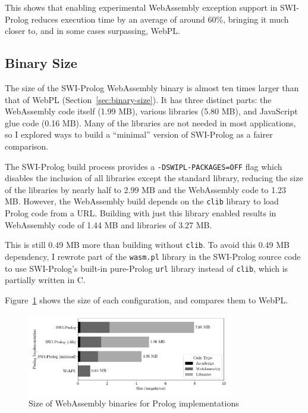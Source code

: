 This shows that enabling experimental WebAssembly exception support in SWI-Prolog reduces execution time by an average of around 60\%, bringing it much closer to, and in some cases surpassing, WebPL.

\subsection{Binary Size}

\label{sec:binary-size-opt}

The size of the SWI-Prolog WebAssembly binary is almost ten times larger than that of WebPL (Section~\ref{sec:binary-size}). It has three distinct parts: the WebAssembly code itself (1.99 MB), various libraries (5.80 MB), and JavaScript glue code (0.16 MB). Many of the libraries are not needed in most applications, so I explored ways to build a ``minimal'' version of SWI-Prolog as a fairer comparison.

The SWI-Prolog build process provides a \texttt{-DSWIPL-PACKAGES=OFF} flag which disables the inclusion of all libraries except the standard library, reducing the size of the libraries by nearly half to 2.99 MB and the WebAssembly code to 1.23 MB. However, the WebAssembly build depends on the \texttt{clib} library to load Prolog code from a URL. Building with just this library enabled results in WebAssembly code of 1.44 MB and libraries of 3.27 MB.

This is still 0.49 MB more than building without \texttt{clib}. To avoid this 0.49 MB dependency, I rewrote part of the \texttt{wasm.pl} library in the SWI-Prolog source code to use SWI-Prolog's built-in pure-Prolog \texttt{url} library instead of \texttt{clib}, which is partially written in C.

Figure~\ref{fig:binary-size} shows the size of each configuration, and compares them to WebPL.

\begin{figure}[H]
\centering
\includegraphics[width=0.8\textwidth]{binary_size.pdf}
\caption{Size of WebAssembly binaries for Prolog implementations}
\label{fig:binary-size}
\end{figure}

